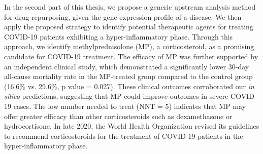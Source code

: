 \documentclass[Minh_PhD_thesis.tex]{subfiles}
\begin{document}
%

%


In the second part of this thesis, we propose a generic upstream analysis method for drug repurposing, given the gene expression profile of a disease. We then apply the proposed strategy to identify potential therapeutic agents for treating COVID-19 patients exhibiting a hyper-inflammatory phase. Through this approach, we identify methylprednisolone (MP), a corticosteroid, as a promising candidate for COVID-19 treatment. The efficacy of MP was further supported by an independent clinical study, which demonstrated a significantly lower 30-day all-cause mortality rate in the MP-treated group compared to the control group (16.6\% vs. 29.6\%,  p value = 0.027). These clinical outcomes corroborated our \textit{in silico} predictions, suggesting that MP could improve outcomes in severe COVID-19 cases. The low number needed to treat (NNT = 5) indicates that MP may offer greater efficacy than other corticosteroids such as dexamethasone or hydrocortisone. In late 2020, the World Health Organization revised its guidelines to recommend corticosteroids for the treatment of COVID-19 patients in the hyper-inflammatory phase.

\end{document}
